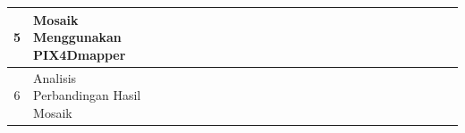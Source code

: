 \begin{table}[H]
{\begin{tabular}{|c|l|llll|llll|llll|llll|llll|llll|}
  5                    & Mosaik Menggunakan PIX4Dmapper                                  & \multicolumn{1}{l|}{}                         & \multicolumn{1}{l|}{}                         & \multicolumn{1}{l|}{}                         &                          & \multicolumn{1}{l|}{}                         & \multicolumn{1}{l|}{}                         & \multicolumn{1}{l|}{}                         &                          & \multicolumn{1}{l|}{}                         & \multicolumn{1}{l|}{}                         & \multicolumn{1}{l|}{}                         &                          & \multicolumn{1}{l|}{} & \multicolumn{1}{l|}{} & \multicolumn{1}{l|}{}                         &                          & \multicolumn{1}{l|}{\cellcolor[HTML]{656565}{\color[HTML]{656565} }}                         & \multicolumn{1}{l|}{\cellcolor[HTML]{656565}{\color[HTML]{656565} }}                         & \multicolumn{1}{l|}{\cellcolor[HTML]{656565}{\color[HTML]{656565} }}                         &                          & \multicolumn{1}{l|}{}                         & \multicolumn{1}{l|}{}                         & \multicolumn{1}{l|}{}                         &                          \\ \hline
  6                    & Analisis Perbandingan Hasil Mosaik                                  & \multicolumn{1}{l|}{}                         & \multicolumn{1}{l|}{}                         & \multicolumn{1}{l|}{}                         &                          & \multicolumn{1}{l|}{}                         & \multicolumn{1}{l|}{}                         & \multicolumn{1}{l|}{}                         &                          & \multicolumn{1}{l|}{}                         & \multicolumn{1}{l|}{}                         & \multicolumn{1}{l|}{}                         &                          & \multicolumn{1}{l|}{}                        & \multicolumn{1}{l|}{}                        & \multicolumn{1}{l|}{} & & \multicolumn{1}{l|}{} & \multicolumn{1}{l|}{} & \multicolumn{1}{l|}{}                         &                          \cellcolor[HTML]{656565}& \multicolumn{1}{l|}{\cellcolor[HTML]{656565}}                         & \multicolumn{1}{l|}{}                         & \multicolumn{1}{l|}{}                         &                          \\ \hline

\end{tabular}}
\end{table}

